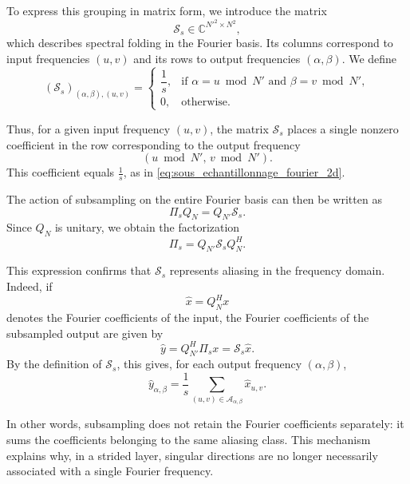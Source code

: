 To express this grouping in matrix form, we introduce the matrix
\[
    \mathcal{S}_s \in \mathbb{C}^{N'^2 \times N^2},
\]
which describes spectral folding in the Fourier basis. Its columns correspond to input
frequencies $(u,v)$ and its rows to output frequencies $(\alpha,\beta)$. We define
\begin{equation}
    (\mathcal{S}_s)_{(\alpha,\beta),(u,v)}
    =
    \begin{cases}
        \dfrac{1}{s},
        & \text{if } \alpha = u \bmod N'
        \text{ and } \beta = v \bmod N', \\[0.4em]
        0,
        & \text{otherwise.}
    \end{cases}
    \label{eq:def_matrice_sampling_fourier}
\end{equation}

Thus, for a given input frequency $(u,v)$, the matrix $\mathcal{S}_s$ places a single nonzero
coefficient in the row corresponding to the output frequency
\[
    (u \bmod N',\, v \bmod N').
\]
This coefficient equals $\frac{1}{s}$, as in \eqref{eq:sous_echantillonnage_fourier_2d}.

The action of subsampling on the entire Fourier basis can then be written as
\begin{equation}
    \Pi_s Q_N
    =
    Q_{N'} \mathcal{S}_s.
    \label{eq:sampling_base_fourier}
\end{equation}
Since $Q_N$ is unitary, we obtain the factorization
\begin{equation}
    \Pi_s
    =
    Q_{N'} \mathcal{S}_s Q_N^H.
    \label{eq:factorisation_sampling_fourier}
\end{equation}

This expression confirms that $\mathcal{S}_s$ represents aliasing in the frequency domain.
Indeed, if
\[
    \widehat{x}=Q_N^H x
\]
denotes the Fourier coefficients of the input, the Fourier coefficients of the subsampled output
are given by
\[
    \widehat{y}
    =
    Q_{N'}^H\Pi_s x
    =
    \mathcal{S}_s \widehat{x}.
\]
By the definition of $\mathcal{S}_s$, this gives, for each output frequency $(\alpha,\beta)$,
\begin{equation}
    \widehat{y}_{\alpha,\beta}
    =
    \frac{1}{s}
    \sum_{(u,v)\in\mathcal{A}_{\alpha,\beta}}
    \widehat{x}_{u,v}.
    \label{eq:somme_coefficients_aliasing}
\end{equation}

In other words, subsampling does not retain the Fourier coefficients separately:
it sums the coefficients belonging to the same aliasing class. This mechanism explains
why, in a strided layer, singular directions are no longer necessarily associated
with a single Fourier frequency.

